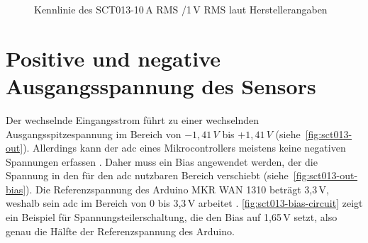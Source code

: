 	
	\begin{figure}[H]
		\centering
		\caption{Kennlinie des SCT013-10\,A RMS /1\,V RMS laut Herstellerangaben \cite{YHDC:2017}}
		\label{fig:sct013-characteristic}
	\end{figure}

\section{Positive und negative Ausgangsspannung des Sensors \label{sctPosandNegOutputVoltage}}
Der wechselnde Eingangsstrom führt zu einer wechselnden Ausgangsspitzespannung im Bereich von $-1,41\,V$ bis $+1,41\,V$ (siehe~\autoref{fig:sct013-out}). 
Allerdings kann der \ac{adc} eines Mikrocontrollers meistens keine negativen Spannungen erfassen \cite{STMicro:2007}. 
Daher muss ein Bias angewendet werden, der die Spannung in den für den \ac{adc} nutzbaren Bereich verschiebt (siehe~\autoref{fig:sct013-out-bias}). 
Die Referenzspannung des Arduino MKR WAN 1310 beträgt 3,3\,V, weshalb sein \ac{adc} im Bereich von 0 bis 3,3\,V arbeitet \cite{Arduino:2020}. 
\autoref{fig:sct013-bias-circuit} zeigt ein Beispiel für Spannungsteilerschaltung, die den Bias auf 1,65\,V setzt, also genau die Hälfte der Referenzspannung des Arduino.




